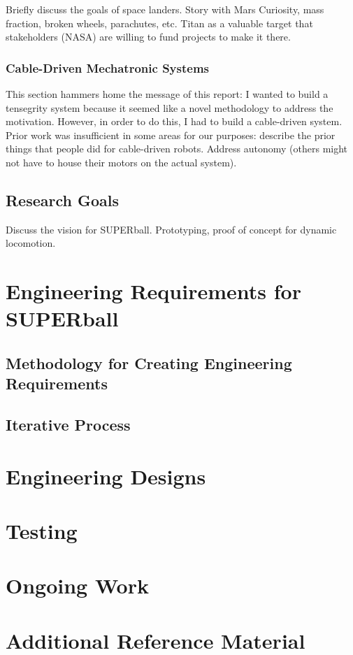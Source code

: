 \documentclass[12pt]{report}
\begin{document}
Briefly discuss the goals of space landers.
Story with Mars Curiosity, mass fraction, broken wheels, parachutes, etc.
Titan as a valuable target that stakeholders (NASA) are willing to fund projects to make it there.

\subsection{Cable-Driven Mechatronic Systems}
This section hammers home the message of this report: I wanted to build a tensegrity system because it seemed like a novel methodology to address the motivation.
However, in order to do this, I had to build a cable-driven system.
Prior work was insufficient in some areas for our purposes: describe the prior things that people did for cable-driven robots.
Address autonomy (others might not have to house their motors on the actual system).


\section{Research Goals}
Discuss the vision for SUPERball.
Prototyping, proof of concept for dynamic locomotion.


\chapter{Engineering Requirements for SUPERball}

\section{Methodology for Creating Engineering Requirements}

\section{Iterative Process}

\chapter{Engineering Designs}

\chapter{Testing}

\chapter{Ongoing Work}


\appendix
\chapter{Additional Reference Material}



%
\end{document}
